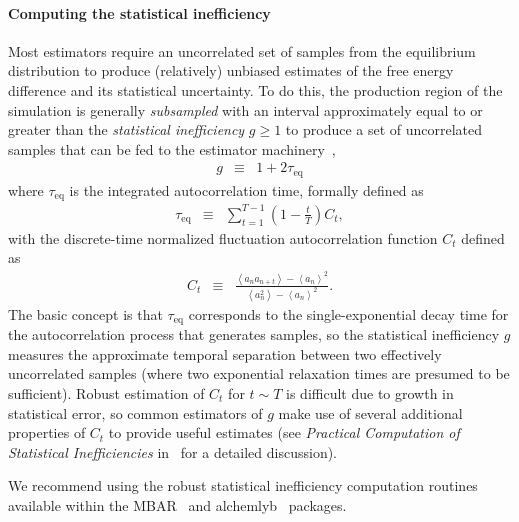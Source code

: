 \documentclass[9pt,bestpractices]{livecoms}
\newcommand{\expect}[1]{\left\langle{#1}\right\rangle}
\begin{document}
\paragraph{Computing the statistical inefficiency}
Most estimators require an uncorrelated set of samples from the equilibrium distribution to produce (relatively) unbiased estimates of the free energy difference and its statistical uncertainty.
To do this, the production region of the simulation is generally \emph{subsampled} with an interval approximately equal to or greater than the \emph{statistical inefficiency} $g \ge 1$ to produce a set of uncorrelated samples that can be fed to the estimator machinery~\cite{chodera2016simple},
\begin{eqnarray}
g &\equiv& 1 + 2 \tau_\mathrm{eq} \label{eq:statistical-inefficiency-definition}
\end{eqnarray}
where $\tau_\mathrm{eq}$ is the integrated autocorrelation time, formally defined as
\begin{eqnarray}
\tau_\mathrm{eq} &\equiv& \sum_{t=1}^{T-1} \left(1 - \frac{t}{T}\right) C_t \label{eq:integrated-autocorrelation-time-definition} , 
\end{eqnarray}
with the discrete-time normalized fluctuation autocorrelation function $C_t$ defined as
\begin{eqnarray}
C_t &\equiv& \frac{\expect{a_n a_{n+t}} - \expect{a_n}^2}{\expect{a_n^2} - \expect{a_n}^2} . \label{equation:autocorrelation-definition}
\end{eqnarray}
The basic concept is that $\tau_\mathrm{eq}$ corresponds to the single-exponential decay time for the autocorrelation process that generates samples, so the statistical inefficiency $g$ measures the approximate temporal separation between two effectively uncorrelated samples (where two exponential relaxation times are presumed to be sufficient).
%
Robust estimation of $C_t$ for $t \sim T$ is difficult due to growth in statistical error, so common estimators of $g$ make use of several additional properties of $C_t$ to provide useful estimates (see \emph{Practical Computation of Statistical Inefficiencies} in~\cite{chodera2016simple} for a detailed discussion).

We recommend using the robust statistical inefficiency computation routines available within the MBAR~\cite{kylebeauchamp2019choderalab} and alchemlyb~\cite{daviddotson2019alchemistry} packages.
%
\end{document}
